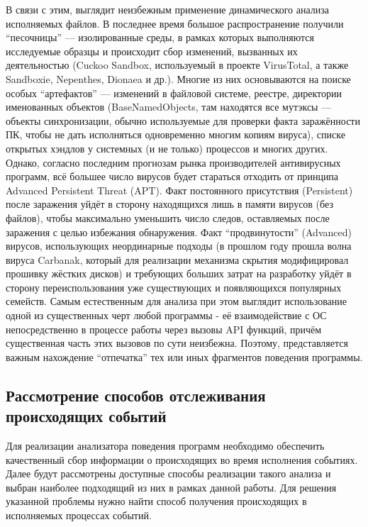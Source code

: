 В связи с этим, выглядит неизбежным применение динамического анализа исполняемых файлов. В последнее время большое распространение получили ``песочницы'' --- изолированные среды, в рамках которых выполняются исследуемые образцы и происходит сбор изменений, вызванных их деятельностью (Cuckoo Sandbox, используемый в проекте VirusTotal, а также Sandboxie, Nepenthes, Dionaea и др.). Многие из них основываются на поиске особых ``артефактов'' --- изменений в файловой системе, реестре, директории именованных объектов (BaseNamedObjects, там находятся все мутэксы --- объекты синхронизации, обычно используемые для проверки факта заражённости ПК, чтобы не дать исполняться одновременно многим копиям вируса), списке открытых хэндлов у системных (и не только) процессов и многих других. Однако, согласно последним прогнозам рынка производителей антивирусных программ\cite{KASPERKSYBULLETIN}, всё большее число вирусов будет стараться отходить от принципа Advanced Persistent Threat (APT). Факт постоянного присутствия (Persistent) после заражения уйдёт в сторону находящихся лишь в памяти вирусов (без файлов), чтобы максимально уменьшить число следов, оставляемых после заражения с целью избежания обнаружения. Факт ``продвинутости'' (Advanced) вирусов, использующих неординарные подходы (в прошлом году прошла волна вируса Carbanak\cite{CARBANAK}, который для реализации механизма скрытия модифицировал прошивку жёстких дисков) и требующих больших затрат на разработку уйдёт в сторону переиспользования уже существующих и появляющихся популярных семейств. Самым естественным для анализа при этом выглядит использование одной из существенных черт любой программы - её взаимодействие с ОС непосредственно в процессе работы через вызовы API функций, причём существенная часть этих вызовов по сути неизбежна. Поэтому, представляется важным нахождение ``отпечатка'' тех или иных фрагментов поведения программы.

\subsection {Рассмотрение способов отслеживания происходящих событий}
Для реализации анализатора поведения программ необходимо обеспечить качественный сбор информации о происходящих во время исполнения событиях. Далее будут рассмотрены доступные способы реализации такого анализа и выбран наиболее подходящий из них в рамках данной работы.
Для решения указанной проблемы нужно найти способ получения происходящих в исполняемых процессах событий. 

